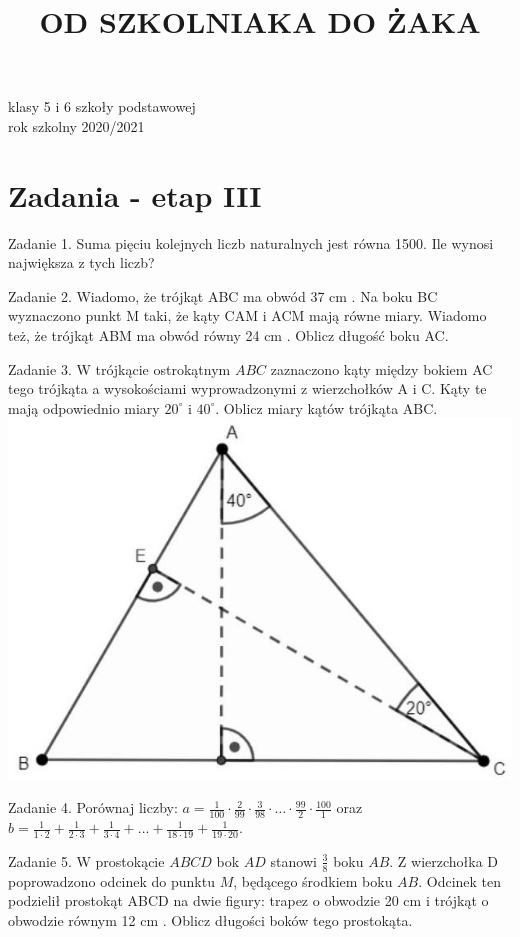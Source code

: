 \documentclass[10pt]{article}
\title{OD SZKOLNIAKA DO ŻAKA }
\author{}
\date{}
\begin{document}
\maketitle
klasy 5 i 6 szkoły podstawowej\\
rok szkolny 2020/2021

\section*{Zadania - etap III}
Zadanie 1. Suma pięciu kolejnych liczb naturalnych jest równa 1500. Ile wynosi największa z tych liczb?

Zadanie 2. Wiadomo, że trójkąt ABC ma obwód 37 cm . Na boku BC wyznaczono punkt M taki, że kąty CAM i ACM mają równe miary. Wiadomo też, że trójkąt ABM ma obwód równy 24 cm . Oblicz długość boku AC.

Zadanie 3. W trójkącie ostrokątnym \(A B C\) zaznaczono kąty między bokiem AC tego trójkąta a wysokościami wyprowadzonymi z wierzchołków A i C. Kąty te mają odpowiednio miary \(20^{\circ}\) i \(40^{\circ}\). Oblicz miary kątów trójkąta ABC.\\
\includegraphics[max width=\textwidth, center]{2024_11_21_9046c7087d49c1f0c0e5g-1}

Zadanie 4. Porównaj liczby: \(a=\frac{1}{100} \cdot \frac{2}{99} \cdot \frac{3}{98} \cdot \ldots \cdot \frac{99}{2} \cdot \frac{100}{1}\) oraz \(b=\frac{1}{1 \cdot 2}+\frac{1}{2 \cdot 3}+\frac{1}{3 \cdot 4}+\ldots+\frac{1}{18 \cdot 19}+\frac{1}{19 \cdot 20}\).

Zadanie 5. W prostokącie \(A B C D\) bok \(A D\) stanowi \(\frac{3}{8}\) boku \(A B\). Z wierzchołka D poprowadzono odcinek do punktu \(M\), będącego środkiem boku \(A B\). Odcinek ten podzielił prostokąt ABCD na dwie figury: trapez o obwodzie 20 cm i trójkąt o obwodzie równym 12 cm . Oblicz długości boków tego prostokąta.
\end{document}
